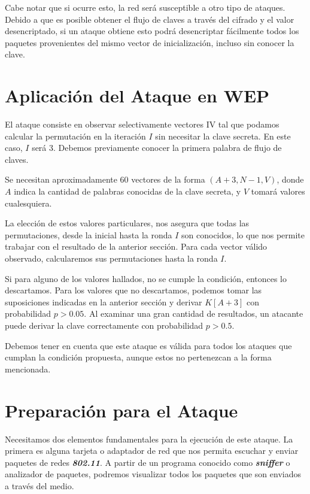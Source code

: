 \documentclass[
]{article}
\begin{document}
Cabe notar que si ocurre esto, la red será susceptible a otro tipo de
ataques. Debido a que es posible obtener el flujo de claves a través del
cifrado y el valor desencriptado, si un ataque obtiene esto podrá
desencriptar fácilmente todos los paquetes provenientes del mismo vector
de inicialización, incluso sin conocer la clave.

\hypertarget{aplicaciuxf3n-del-ataque-en-wep}{%
\section{Aplicación del Ataque en
WEP}\label{aplicaciuxf3n-del-ataque-en-wep}}

El ataque consiste en observar selectivamente vectores \(\text{IV}\) tal
que podamos calcular la permutación en la iteración \(I\) sin necesitar
la clave secreta. En este caso, \(I\) será \(3\). Debemos previamente
conocer la primera palabra de flujo de claves.

Se necesitan aproximadamente \(60\) vectores de la forma
\((A+3, N-1, V)\), donde \(A\) indica la cantidad de palabras conocidas
de la clave secreta, y \(V\) tomará valores cualesquiera.

La elección de estos valores particulares, nos asegura que todas las
permutaciones, desde la inicial hasta la ronda \(I\) son conocidos, lo
que nos permite trabajar con el resultado de la anterior sección. Para
cada vector válido observado, calcularemos sus permutaciones hasta la
ronda \(I\).

Si para alguno de los valores hallados, no se cumple la condición,
entonces lo descartamos. Para los valores que no descartamos, podemos
tomar las suposiciones indicadas en la anterior sección y derivar
\(K[A+3]\) con probabilidad \(p > 0.05\). Al examinar una gran cantidad
de resultados, un atacante puede derivar la clave correctamente con
probabilidad \(p > 0.5\).

Debemos tener en cuenta que este ataque es válida para todos los ataques
que cumplan la condición propuesta, aunque estos no pertenezcan a la
forma mencionada.

\hypertarget{preparaciuxf3n-para-el-ataque}{%
\section{Preparación para el
Ataque}\label{preparaciuxf3n-para-el-ataque}}

Necesitamos dos elementos fundamentales para la ejecución de este
ataque. La primera es alguna tarjeta o adaptador de red que nos permita
escuchar y enviar paquetes de redes \textbf{\emph{802.11}}. A partir de
un programa conocido como \textbf{\emph{sniffer}} o analizador de
paquetes, podremos visualizar todos los paquetes que son enviados a
través del medio.
\end{document}

